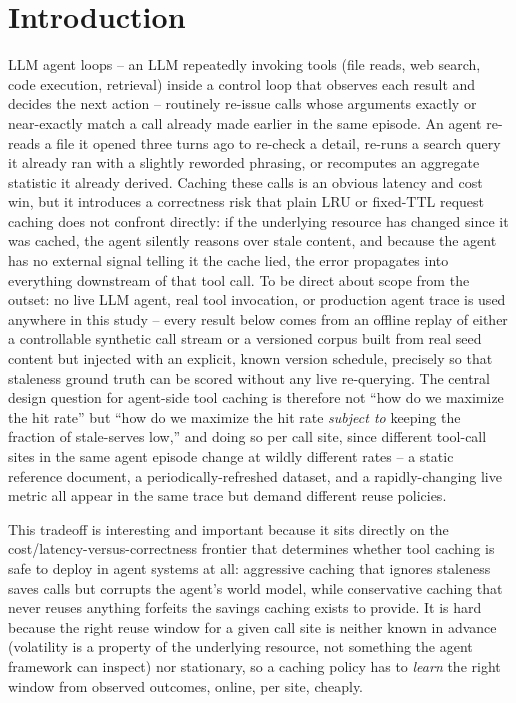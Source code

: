 \documentclass[11pt,letterpaper]{article}
\begin{document}
\section{Introduction}

LLM agent loops -- an LLM repeatedly invoking tools (file reads, web search, code execution, retrieval)
inside a control loop that observes each result and decides the next action -- routinely re-issue calls
whose arguments exactly or near-exactly match a call already made earlier in the same episode. An agent
re-reads a file it opened three turns ago to re-check a detail, re-runs a search query it already ran with
a slightly reworded phrasing, or recomputes an aggregate statistic it already derived. Caching these calls
is an obvious latency and cost win, but it introduces a correctness risk that plain LRU or fixed-TTL
request caching does not confront directly: if the underlying resource has changed since it was cached,
the agent silently reasons over stale content, and because the agent has no external signal telling it the
cache lied, the error propagates into everything downstream of that tool call. To be direct about scope
from the outset: no live LLM agent, real tool invocation, or production agent trace is used anywhere in
this study -- every result below comes from an offline replay of either a controllable synthetic call
stream or a versioned corpus built from real seed content but injected with an explicit, known version
schedule, precisely so that staleness ground truth can be scored without any live re-querying. The central
design question for agent-side tool caching is therefore not ``how do we maximize the hit rate'' but ``how do
we maximize the hit rate \emph{subject to} keeping the fraction of stale-serves low,'' and doing so per call
site, since different tool-call sites in the same agent episode change at wildly different rates -- a
static reference document, a periodically-refreshed dataset, and a rapidly-changing live metric all appear
in the same trace but demand different reuse policies.

This tradeoff is interesting and important because it sits directly on the cost/latency-versus-correctness
frontier that determines whether tool caching is safe to deploy in agent systems at all: aggressive caching
that ignores staleness saves calls but corrupts the agent's world model, while conservative caching that
never reuses anything forfeits the savings caching exists to provide. It is hard because the right reuse
window for a given call site is neither known in advance (volatility is a property of the underlying
resource, not something the agent framework can inspect) nor stationary, so a caching policy has to \emph{learn}
the right window from observed outcomes, online, per site, cheaply.
\end{document}
